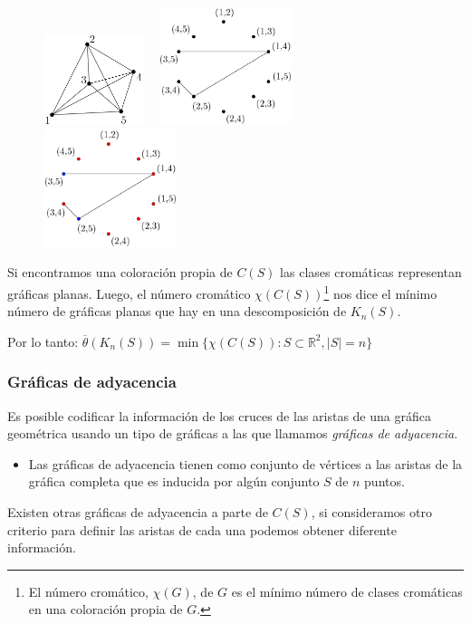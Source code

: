 \begin{frame}
\begin{figure}
	\centering
	\includegraphics[width=0.26\textwidth]{images/K5}%
	~\vrule
	\includegraphics[width=0.35\textwidth]{images/EppK5}
	~\vrule
	\includegraphics[width=0.35\textwidth]{images/EppK5_colored}
\end{figure}
Si encontramos una coloración propia de $C(S)$ las clases cromáticas representan gráficas planas. Luego, el número cromático $\chi(C(S))$\let\thefootnote\relax\footnote{El número cromático, $\chi(G)$, de $G$ es el mínimo número de clases cromáticas en una coloración propia de $G$.} nos dice el mínimo número de gráficas planas que hay en una descomposición de $K_n(S)$.

Por lo tanto: $\overline{\theta}(K_n(S)) = \min\{\chi(C(S)) : S \subset \mathbb{R}^2, |S| = n\}$
\end{frame}

\begin{frame}\frametitle{Gráficas de adyacencia}
Es posible codificar la información de los cruces de las aristas de una gráfica geométrica usando un tipo de gráficas a las que llamamos \emph{gráficas de adyacencia}.

\begin{itemize}
	\item Las gráficas de adyacencia tienen como conjunto de vértices a las aristas de la gráfica completa que es inducida por algún conjunto $S$ de $n$ puntos.
\end{itemize}

	Existen otras gráficas de adyacencia a parte de $C(S)$, si consideramos otro criterio para definir las aristas de cada una podemos obtener diferente información.
\end{frame}

